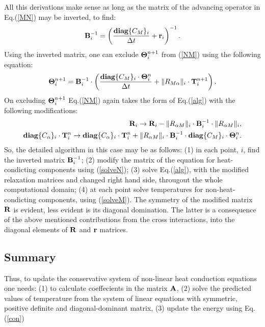 \documentclass[12pt]{revtex4}
\begin{document}
All this derivations make sense as long as the matrix of the advancing operator in Eq.(\ref{MN}) may be inverted, to find:
\begin{equation}
{\bf B}_i^{-1}=\left(\frac{{\bf diag}\{C_M\}_i}{\Delta t}+{\bf r}_i\right)^{-1}.
\end{equation}
Using the inverted matrix, one can exclude ${\bf \Theta}^{n+1}_i$ from (\ref{NM}) using the following equation:
\begin{equation}
{\bf \Theta}^{n+1}_i={\bf B}_i^{-1}\cdot\left(\frac{{\bf diag}\{C_M\}_i\cdot{\bf \Theta}^{n}_i}{\Delta t}+ \|R_{ M \alpha}\|_i\cdot{\bf T}_i^{n+1}\right).\label{solveM}
\end{equation}
On excluding ${\bf \Theta}^{n+1}_i$ Eq.(\ref{NM}) again takes the form of Eq.(\ref{alg}) with the following modifications:
\begin{eqnarray}
{\bf R}_i\rightarrow {\bf R}_i-\|R_{\alpha M}\|_i\cdot{\bf B}_i^{-1}\cdot\|R_{\alpha M}\|_i,\nonumber\\%
{\bf diag}\{C_\alpha\}_i\cdot{\bf T}^{n}_i\rightarrow 
{\bf diag}\{C_\alpha\}_i\cdot{\bf T}^{n}_i+\|R_{\alpha M}\|_i\cdot{\bf B}_i^{-1}\cdot {\bf diag}\{C_M\}_i\cdot{\bf \Theta}^{n}_i.\label{solveN}
\end{eqnarray}
So, the detailed algorithm in this case may be as follows: (1) in each point, $i$, find the inverted matrix ${\bf B}_i^{-1}$; (2) modify the matrix of the equation
for heat-condicting components using (\ref{solveN}); (3) solve Eq.(\ref{alg}), with the modified relaxation matrices and changed right hand side, througout the
whole computational domain; (4) at each point solve temperatures for non-heat-condicting components, using (\ref{solveM}). The symmetry of the modified matrix ${\bf R}$ is
evident, less evident is its diagonal domination. The latter is a consequence of the above mentioned contributions from the cross interactions, into the diagonal elements of 
${\bf R}$ and ${\bf r}$ matrices.


\subsection{Summary}
Thus, to update the conservative system of non-linear heat conduction equations one needs: (1) to calculate coeffecients in the matrix ${\bf A}$, 
(2) solve the predicted values of temperature from the system of linear equations with symmetric, positive definite and diagonal-dominant matrix, 
(3) update the energy using Eq.(\ref{con})
\end{document}
